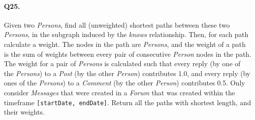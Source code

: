 \paragraph{Q25.}
Given two \emph{Persons}, find all (unweighted) shortest paths between
these two \emph{Persons}, in the subgraph induced by the \emph{knows}
relationship.
Then, for each path calculate a weight. The nodes in the path are
\emph{Persons}, and the weight of a path is the sum of weights between
every pair of consecutive \emph{Person} nodes in the path.
The weight for a pair of \emph{Persons} is calculated such that every
reply (by one of the \emph{Persons}) to a \emph{Post} (by the other
\emph{Person}) contributes 1.0, and every reply (by ones of the
\emph{Persons}) to a \emph{Comment} (by the other \emph{Person})
contributes 0.5.
Only consider \emph{Messages} that were created in a \emph{Forum} that
was created within the timeframe \texttt{{[}startDate,\ endDate{]}}.
Return all the paths with shortest length, and their weights.
